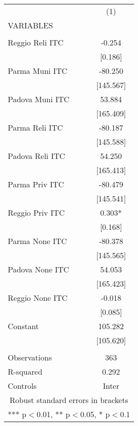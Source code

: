 \begin{tabular}{lc} \hline
 & (1) \\
VARIABLES &  \\ \hline
 &  \\
Reggio Reli ITC & -0.254 \\
 & [0.186] \\
Parma Muni ITC & -80.250 \\
 & [145.567] \\
Padova Muni ITC & 53.884 \\
 & [165.409] \\
Parma Reli ITC & -80.187 \\
 & [145.588] \\
Padova Reli ITC & 54.250 \\
 & [165.413] \\
Parma Priv ITC & -80.479 \\
 & [145.541] \\
Reggio Priv ITC & 0.303* \\
 & [0.168] \\
Parma None ITC & -80.378 \\
 & [145.565] \\
Padova None ITC & 54.053 \\
 & [165.423] \\
Reggio None ITC & -0.018 \\
 & [0.085] \\
Constant & 105.282 \\
 & [105.620] \\
 &  \\
Observations & 363 \\
R-squared & 0.292 \\
 Controls & Inter \\ \hline
\multicolumn{2}{c}{ Robust standard errors in brackets} \\
\multicolumn{2}{c}{ *** p$<$0.01, ** p$<$0.05, * p$<$0.1} \\
\end{tabular}
